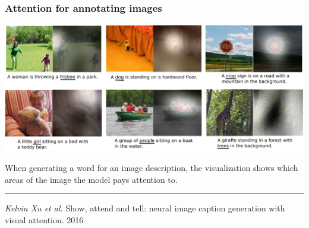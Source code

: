 \documentclass[fullscreen=true, bookmarks=true, hyperref={pdfencoding=unicode}]{beamer}
\begin{document}
\begin{frame}
  \frametitle{Attention for annotating images}

  \begin{center}
    \includegraphics[keepaspectratio,
                   width=.8\paperwidth]{image_attention.png}
  \end{center}

  When generating a word for an image description, the visualization shows which areas of the image the model pays attention to.

  \noindent\rule{8cm}{0.4pt}

  {\small
  {\it Kelvin Xu et al.} Show, attend and tell: neural image caption generation with visual
  attention. 2016}
\end{frame}
\end{document}
